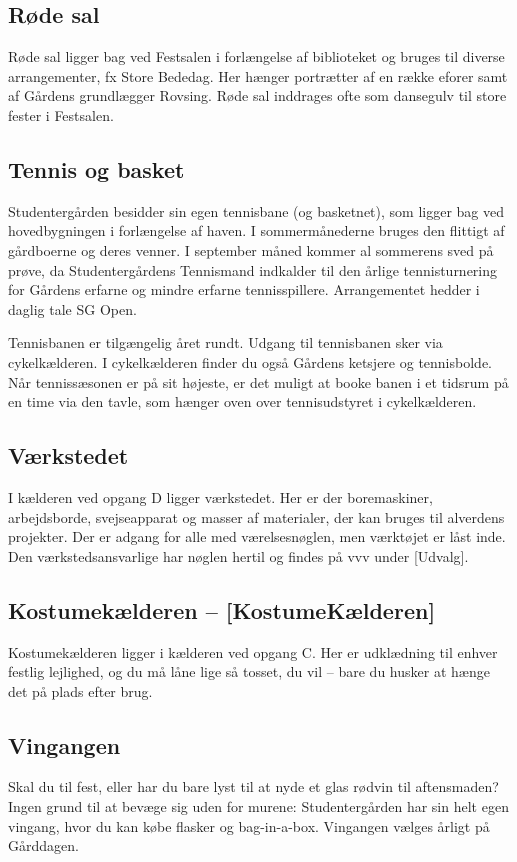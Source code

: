 \documentclass[11pt,article,twoside,openany,danish,extrafontsizes]{memoir} %
\begin{document}
\subsection{Røde sal}
Røde sal ligger bag ved Festsalen i forlængelse af biblioteket og bruges til diverse arrangementer, fx Store Bededag. Her hænger portrætter af en række eforer samt af Gårdens grundlægger Rovsing. Røde sal inddrages ofte som dansegulv til store fester i Festsalen.


\subsection{Tennis og basket}
Studentergården besidder sin egen tennisbane (og basketnet), som ligger bag ved hovedbygningen i forlængelse af haven. I sommermånederne bruges den flittigt af gårdboerne og deres venner. I september måned kommer al sommerens sved på prøve, da Studentergårdens Tennismand indkalder til den årlige tennisturnering for Gårdens erfarne og mindre erfarne tennisspillere. Arrangementet hedder i daglig tale SG Open.

Tennisbanen er tilgængelig året rundt. Udgang til tennisbanen sker via cykelkælderen. I cykelkælderen finder du også Gårdens ketsjere og tennisbolde. Når tennissæsonen er på sit højeste, er det muligt at booke banen i et tidsrum på en time via den tavle, som hænger oven over tennisudstyret i cykelkælderen.



\subsection{Værkstedet}
I kælderen ved opgang D ligger værkstedet. Her er der boremaskiner, arbejdsborde, svejseapparat og masser af materialer, der kan bruges til alverdens projekter. Der er adgang for alle med værelsesnøglen, men værktøjet er låst inde. Den værkstedsansvarlige har nøglen hertil og findes på vvv under  [Udvalg].

\subsection{Kostumekælderen -- [KostumeKælderen]}
Kostumekælderen ligger i kælderen ved opgang C. Her er udklædning til enhver festlig lejlighed, og du må låne lige så tosset, du vil -- bare du husker at hænge det på plads efter brug.

\subsection{Vingangen}
Skal du til fest, eller har du bare lyst til at nyde et glas rødvin til aftensmaden? Ingen grund til at bevæge sig uden for murene: Studentergården har sin helt egen vingang, hvor du kan købe flasker og bag-in-a-box. Vingangen vælges årligt på Gårddagen.
\end{document}
